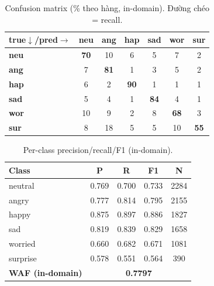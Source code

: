 \documentclass[10pt]{article}
\begin{document}
\begin{table}[H]\centering\footnotesize\setlength{\tabcolsep}{4pt}
\begin{tabular}{lcccccc}
\toprule
\textbf{true$\downarrow$/pred$\rightarrow$} & \textbf{neu} & \textbf{ang} & \textbf{hap} & \textbf{sad} & \textbf{wor} & \textbf{sur} \\
\midrule
\textbf{neu} & \cellcolor{cmblue!49}\textbf{70} & \cellcolor{cmblue!7}10 & \cellcolor{cmblue!5}6 & \cellcolor{cmblue!3}5 & \cellcolor{cmblue!5}7 & \cellcolor{cmblue!1}2 \\
\textbf{ang} & \cellcolor{cmblue!5}7 & \cellcolor{cmblue!57}\textbf{81} & \cellcolor{cmblue!1}1 & \cellcolor{cmblue!2}3 & \cellcolor{cmblue!3}5 & \cellcolor{cmblue!2}2 \\
\textbf{hap} & \cellcolor{cmblue!4}6 & \cellcolor{cmblue!1}2 & \cellcolor{cmblue!63}\textbf{90} & \cellcolor{cmblue!1}1 & \cellcolor{cmblue!1}1 & \cellcolor{cmblue!1}1 \\
\textbf{sad} & \cellcolor{cmblue!4}5 & \cellcolor{cmblue!3}4 & \cellcolor{cmblue!1}1 & \cellcolor{cmblue!59}\textbf{84} & \cellcolor{cmblue!3}4 & \cellcolor{cmblue!1}1 \\
\textbf{wor} & \cellcolor{cmblue!7}10 & \cellcolor{cmblue!6}9 & \cellcolor{cmblue!1}2 & \cellcolor{cmblue!6}8 & \cellcolor{cmblue!48}\textbf{68} & \cellcolor{cmblue!2}3 \\
\textbf{sur} & \cellcolor{cmblue!5}8 & \cellcolor{cmblue!12}18 & \cellcolor{cmblue!4}5 & \cellcolor{cmblue!3}5 & \cellcolor{cmblue!7}10 & \cellcolor{cmblue!39}\textbf{55} \\
\bottomrule
\end{tabular}
\caption{Confusion matrix (\% theo hàng, in-domain). Đường chéo = recall.}
\end{table}

\begin{table}[H]\centering\footnotesize
\begin{tabular}{lcccc}
\toprule
\textbf{Class} & \textbf{P} & \textbf{R} & \textbf{F1} & \textbf{N} \\
\midrule
neutral & 0.769 & 0.700 & 0.733 & 2284 \\
angry & 0.777 & 0.814 & 0.795 & 2155 \\
happy & 0.875 & 0.897 & 0.886 & 1827 \\
sad & 0.819 & 0.839 & 0.829 & 1658 \\
worried & 0.660 & 0.682 & 0.671 & 1081 \\
surprise & 0.578 & 0.551 & 0.564 & 390 \\
\midrule
\textbf{WAF (in-domain)} & \multicolumn{4}{c}{\textbf{0.7797}} \\
\bottomrule
\end{tabular}
\caption{Per-class precision/recall/F1 (in-domain).}
\end{table}
\end{document}
